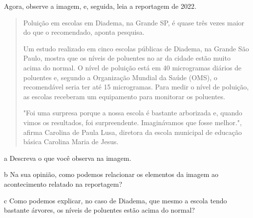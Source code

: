 Agora, observe a imagem, e, seguida, leia a reportagem de 2022.


\begin{quote}
Poluição em escolas em Diadema, na Grande SP, é quase três vezes maior
do que o recomendado, aponta pesquisa.

Um estudo realizado em cinco escolas públicas de Diadema, na Grande São
Paulo, mostra que os níveis de poluentes no ar da cidade estão muito
acima do normal. O nível de poluição está em 40 microgramas diários de
poluentes e, segundo a Organização Mundial da Saúde (OMS), o
recomendável seria ter até 15 microgramas. Para medir o nível de
poluição, as escolas receberam um equipamento para monitorar os
poluentes.

"Foi uma surpresa porque a nossa escola é bastante arborizada e, quando
vimos os resultados, foi surpreendente. Imaginávamos que fosse melhor.",
afirma Carolina de Paula Lusa, diretora da escola municipal de educação
básica Carolina Maria de Jesus.

\end{quote}

\num{a} Descreva o que você observa na imagem.


\num{b} Na sua opinião, como podemos relacionar os elementos da imagem ao
acontecimento relatado na reportagem?


\num{c} Como podemos explicar, no caso de Diadema, que mesmo a escola tendo
bastante árvores, os níveis de poluentes estão acima do normal?


